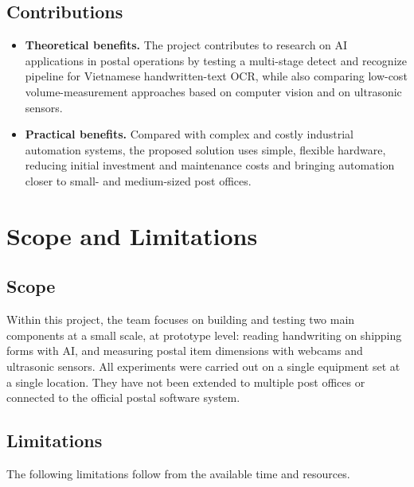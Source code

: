 \subsection{Contributions}

\begin{itemize}
    \item \textbf{Theoretical benefits.} The project contributes to research on AI applications in postal operations by testing a multi-stage detect and recognize pipeline for Vietnamese handwritten-text OCR, while also comparing low-cost volume-measurement approaches based on computer vision and on ultrasonic sensors.

    \item \textbf{Practical benefits.} Compared with complex and costly industrial automation systems, the proposed solution uses simple, flexible hardware, reducing initial investment and maintenance costs and bringing automation closer to small- and medium-sized post offices.
\end{itemize}

\section{Scope and Limitations}

\subsection{Scope}

Within this project, the team focuses on building and testing two main components at a small scale, at prototype level: reading handwriting on shipping forms with AI, and measuring postal item dimensions with webcams and ultrasonic sensors. All experiments were carried out on a single equipment set at a single location. They have not been extended to multiple post offices or connected to the official postal software system.

\subsection{Limitations}

The following limitations follow from the available time and resources.

